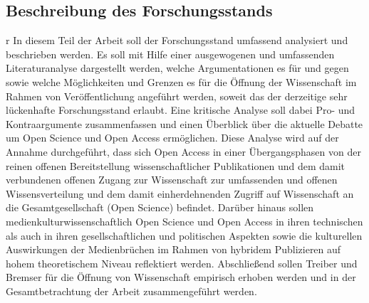 \subsection{Beschreibung des Forschungsstands}r
In diesem Teil der Arbeit soll der Forschungsstand umfassend analysiert und beschrieben werden. Es soll mit Hilfe einer ausgewogenen und umfassenden Literaturanalyse dargestellt werden, welche Argumentationen es für und gegen sowie welche Möglichkeiten und Grenzen es für die Öffnung der Wissenschaft im Rahmen von Veröffentlichung angeführt werden, soweit das der derzeitige sehr lückenhafte Forschungsstand erlaubt. Eine kritische Analyse soll dabei Pro- und Kontraargumente zusammenfassen und einen Überblick über die aktuelle Debatte um Open Science und Open Access ermöglichen. Diese Analyse wird auf der Annahme durchgeführt, dass sich Open Access in einer Übergangsphasen von der reinen offenen Bereitstellung wissenschaftlicher Publikationen und dem damit verbundenen offenen Zugang zur Wissenschaft zur umfassenden und offenen Wissensverteilung und dem damit einherdehnenden Zugriff auf Wissenschaft an die Gesamtgesellschaft (Open Science) befindet. Darüber hinaus sollen medienkulturwissenschaftlich Open Science und Open Access in ihren technischen als auch in ihren gesellschaftlichen und politischen Aspekten sowie die kulturellen Auswirkungen der Medienbrüchen im Rahmen von hybridem Publizieren auf hohem theoretischem Niveau reflektiert werden. Abschließend sollen Treiber und Bremser für die Öffnung von Wissenschaft empirisch erhoben werden und in der Gesamtbetrachtung der Arbeit zusammengeführt werden.

